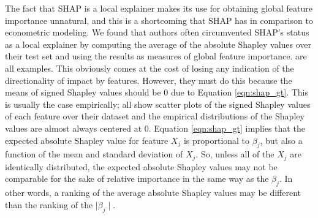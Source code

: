\documentclass[mnsc,blindrev]{informs3}
\begin{document}
     The fact that SHAP is a local explainer makes its use for obtaining global feature importance unnatural, and this is a shortcoming that SHAP has in comparison to econometric modeling. We found that authors often circumvented SHAP's status as a local explainer by computing the average of the absolute Shapley values over their test set and using the results as measures of global feature importance. \cite{lenaers23rent,maeng23vr,guenther2023useful} are all examples. This obviously comes at the cost of losing any indication of the directionality of impact by features. However, they must do this because the means of signed Shapley values should be 0 due to Equation \ref{eqn:shap_gt}. This is usually the case empirically; \cite{lenaers23rent,maeng23vr,jiang24churn} all show scatter plots of the signed Shapley values of each feature over their dataset and the empirical distributions of the Shapley values are almost always centered at 0. Equation \ref{eqn:shap_gt} implies that the expected absolute Shapley value for feature $X_j$ is proportional to $\beta_j$, but also a function of the mean and standard deviation of $X_j$. So, unless all of the $X_j$ are identically distributed, the expected absolute Shapley values may not be comparable for the sake of relative importance in the same way as the $\beta_j$. In other words, a ranking of the average absolute Shapley values may be different than the ranking of the $\mid \beta_j\mid$.  %
\end{document}
